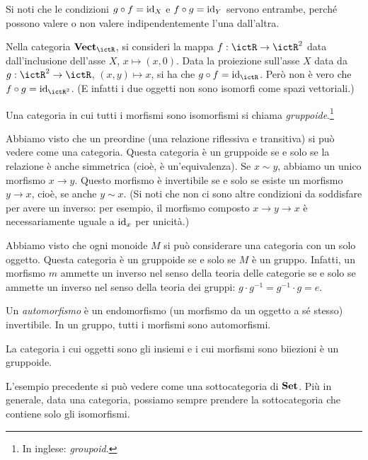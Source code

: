 Si noti che le condizioni $g\circ f = \mathrm{id}_X$ e $f\circ g=\mathrm{id}_Y$ servono entrambe, perché possono valere o non valere indipendentemente l'una dall'altra.
\begin{example}
 Nella categoria $\ctVect_\ictR$, si consideri la mappa $f:\ictR\to\ictR^2$ data dall'inclusione dell'asse $X$, $x\mapsto(x,0)$. Data la proiezione sull'asse $X$ data da $g:\ictR^2\to\ictR$, $(x,y)\mapsto x$, si ha che $g\circ f=\id_\ictR$. Però non è vero che $f\circ g = \id_{\ictR^2}$. (E infatti i due oggetti non sono isomorfi come spazi vettoriali.)
\end{example}

\begin{definition}
 Una categoria in cui tutti i morfismi sono isomorfismi si chiama \emph{gruppoide}.\footnote{In inglese: \emph{groupoid}.}
\end{definition}

\begin{example}
 Abbiamo visto che un preordine (una relazione riflessiva e transitiva) si può vedere come una categoria. Questa categoria è un gruppoide se e solo se la relazione è anche simmetrica (cioè, è un'equivalenza). Se $x\sim y$, abbiamo un unico morfismo $x\to y$. Questo morfismo è invertibile se e solo se esiste un morfismo $y\to x$, cioè, se anche $y\sim x$. (Si noti che non ci sono altre condizioni da soddisfare per avere un inverso: per esempio, il morfismo composto $x\to y\to x$ è necessariamente uguale a $\mathrm{id}_x$ per unicità.)
\end{example}

\begin{example}
 Abbiamo visto che ogni monoide $M$ si può considerare una categoria con un solo oggetto. Questa categoria è un gruppoide se e solo se $M$ è un gruppo. Infatti, un morfismo $m$ ammette un inverso nel senso della teoria delle categorie se e solo se ammette un inverso nel senso della teoria dei gruppi: $g\cdot g^{-1}=g^{-1}\cdot g = e$.
\end{example}

Un \emph{automorfismo} è un endomorfismo (un morfismo da un oggetto a sé stesso) invertibile. In un gruppo, tutti i morfismi sono automorfismi.

\begin{example}
 La categoria i cui oggetti sono gli insiemi e i cui morfismi sono biiezioni è un gruppoide.
\end{example}

L'esempio precedente si può vedere come una sottocategoria di $\mathbf{Set}$.
Più in generale, data una categoria, possiamo sempre prendere la sottocategoria che contiene solo gli isomorfismi.

